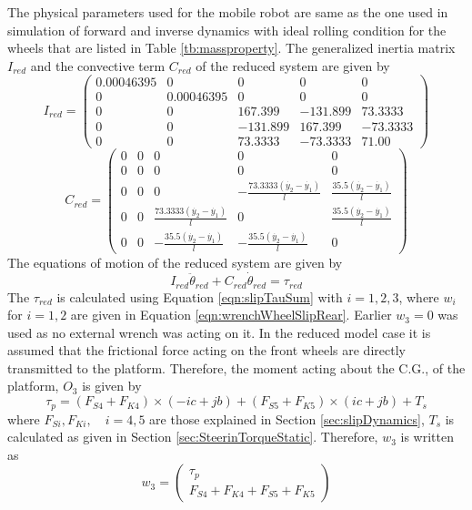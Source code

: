The physical parameters used for the mobile robot are same as the one used in simulation of forward and inverse dynamics with ideal rolling condition for the wheels that  are listed in Table \ref{tb:massproperty}.
The generalized inertia  matrix $I_{red}$  and the convective term $ C_{red}$ of the reduced system are given by
\begin{equation}
I_{red}=\left(
\begin{array}{ccccc}
0.00046395 & 0 & 0 & 0 & 0 \\
0 & 0.00046395 & 0 & 0 & 0 \\
0 & 0 & 167.399 & -131.899 & 73.3333 \\
0 & 0 & -131.899 & 167.399 & -73.3333 \\
0 & 0 & 73.3333 & -73.3333 & 71.00
\end{array}
\right)
\end{equation}
\begin{equation}
C_{red}=\left(
\begin{array}{ccccc}
0 & 0 & 0 & 0 & 0 \\
0 & 0 & 0 & 0 & 0 \\
0 & 0 & 0 & -\frac{73.3333 (\dot{y_2} - \dot{y_1})}{l} & \frac{35.5 (\dot{y_2} - \dot{y_1})}{l} \\
0 & 0 & \frac{73.3333 (\dot{y_2} - \dot{y_1})}{l} & 0 & \frac{35.5 (\dot{y_2} - \dot{y_1})}{l} \\
0 & 0 & -\frac{35.5 (\dot{y_2} - \dot{y_1})}{l} & -\frac{35.5 (\dot{y_2} - \dot{y_1})}{l} & 0
\end{array}
\right)
\end{equation}
The equations of motion of the reduced system are given by 
\begin{equation}
I_{red}\ddot{\theta}_{red}+C_{red}\dot{\theta}_{red}=\tau_{red}
\end{equation}
The $\tau_{red}$ is calculated using Equation \ref{eqn:slipTauSum} with $i=1,2,3 $, where $w_i$ for $ i=1,2$ are given in Equation \ref{eqn:wrenchWheelSlipRear}.
Earlier $w_3=0$ was used as no external wrench was acting on it. In the reduced model case it is assumed that the frictional force acting on the front wheels are directly transmitted to the platform. Therefore, the moment acting about the C.G., of the platform, $O_3$ is given by
\begin{equation}
 	\label{eqn:redPlatMoment}
 	\tau_{p}=(F_{S4}+F_{K4}) \times (-i c+jb) +(F_{S5}+F_{K5}) \times (i c+jb) +T_s
\end{equation}
where $F_{Si},F_{Ki},\quad i=4,5$ are those explained in Section \ref{sec:slipDynamics}, $T_s$ is calculated as given  in Section \ref{sec:SteerinTorqueStatic}.
Therefore, $w_3$ is written as 
\begin{equation}
w_3=\begin{pmatrix}
\tau_{p}\\
F_{S4}+F_{K4}+F_{S5}+F_{K5}
\end{pmatrix}
\end{equation}

